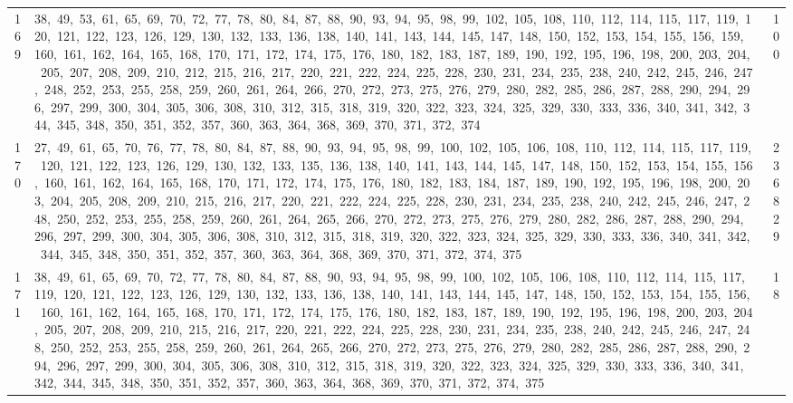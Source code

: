 \begin{longtable}{c|p{}|r}
169 & 38,\ 49,\ 53,\ 61,\ 65,\ 69,\ 70,\ 72,\ 77,\ 78,\ 80,\ 84,\ 87,\ 88,\ 90,\ 93,\ 94,\ 95,\ 98,\ 99,\ 102,\ 105,\ 108,\ 110,\ 112,\ 114,\ 115,\ 117,\ 119,\ 120,\ 121,\ 122,\ 123,\ 126,\ 129,\ 130,\ 132,\ 133,\ 136,\ 138,\ 140,\ 141,\ 143,\ 144,\ 145,\ 147,\ 148,\ 150,\ 152,\ 153,\ 154,\ 155,\ 156,\ 159,\ 160,\ 161,\ 162,\ 164,\ 165,\ 168,\ 170,\ 171,\ 172,\ 174,\ 175,\ 176,\ 180,\ 182,\ 183,\ 187,\ 189,\ 190,\ 192,\ 195,\ 196,\ 198,\ 200,\ 203,\ 204,\ 205,\ 207,\ 208,\ 209,\ 210,\ 212,\ 215,\ 216,\ 217,\ 220,\ 221,\ 222,\ 224,\ 225,\ 228,\ 230,\ 231,\ 234,\ 235,\ 238,\ 240,\ 242,\ 245,\ 246,\ 247,\ 248,\ 252,\ 253,\ 255,\ 258,\ 259,\ 260,\ 261,\ 264,\ 266,\ 270,\ 272,\ 273,\ 275,\ 276,\ 279,\ 280,\ 282,\ 285,\ 286,\ 287,\ 288,\ 290,\ 294,\ 296,\ 297,\ 299,\ 300,\ 304,\ 305,\ 306,\ 308,\ 310,\ 312,\ 315,\ 318,\ 319,\ 320,\ 322,\ 323,\ 324,\ 325,\ 329,\ 330,\ 333,\ 336,\ 340,\ 341,\ 342,\ 344,\ 345,\ 348,\ 350,\ 351,\ 352,\ 357,\ 360,\ 363,\ 364,\ 368,\ 369,\ 370,\ 371,\ 372,\ 374 & 100 \\
170 & 27,\ 49,\ 61,\ 65,\ 70,\ 76,\ 77,\ 78,\ 80,\ 84,\ 87,\ 88,\ 90,\ 93,\ 94,\ 95,\ 98,\ 99,\ 100,\ 102,\ 105,\ 106,\ 108,\ 110,\ 112,\ 114,\ 115,\ 117,\ 119,\ 120,\ 121,\ 122,\ 123,\ 126,\ 129,\ 130,\ 132,\ 133,\ 135,\ 136,\ 138,\ 140,\ 141,\ 143,\ 144,\ 145,\ 147,\ 148,\ 150,\ 152,\ 153,\ 154,\ 155,\ 156,\ 160,\ 161,\ 162,\ 164,\ 165,\ 168,\ 170,\ 171,\ 172,\ 174,\ 175,\ 176,\ 180,\ 182,\ 183,\ 184,\ 187,\ 189,\ 190,\ 192,\ 195,\ 196,\ 198,\ 200,\ 203,\ 204,\ 205,\ 208,\ 209,\ 210,\ 215,\ 216,\ 217,\ 220,\ 221,\ 222,\ 224,\ 225,\ 228,\ 230,\ 231,\ 234,\ 235,\ 238,\ 240,\ 242,\ 245,\ 246,\ 247,\ 248,\ 250,\ 252,\ 253,\ 255,\ 258,\ 259,\ 260,\ 261,\ 264,\ 265,\ 266,\ 270,\ 272,\ 273,\ 275,\ 276,\ 279,\ 280,\ 282,\ 286,\ 287,\ 288,\ 290,\ 294,\ 296,\ 297,\ 299,\ 300,\ 304,\ 305,\ 306,\ 308,\ 310,\ 312,\ 315,\ 318,\ 319,\ 320,\ 322,\ 323,\ 324,\ 325,\ 329,\ 330,\ 333,\ 336,\ 340,\ 341,\ 342,\ 344,\ 345,\ 348,\ 350,\ 351,\ 352,\ 357,\ 360,\ 363,\ 364,\ 368,\ 369,\ 370,\ 371,\ 372,\ 374,\ 375 & 236829 \\
171 & 38,\ 49,\ 61,\ 65,\ 69,\ 70,\ 72,\ 77,\ 78,\ 80,\ 84,\ 87,\ 88,\ 90,\ 93,\ 94,\ 95,\ 98,\ 99,\ 100,\ 102,\ 105,\ 106,\ 108,\ 110,\ 112,\ 114,\ 115,\ 117,\ 119,\ 120,\ 121,\ 122,\ 123,\ 126,\ 129,\ 130,\ 132,\ 133,\ 136,\ 138,\ 140,\ 141,\ 143,\ 144,\ 145,\ 147,\ 148,\ 150,\ 152,\ 153,\ 154,\ 155,\ 156,\ 160,\ 161,\ 162,\ 164,\ 165,\ 168,\ 170,\ 171,\ 172,\ 174,\ 175,\ 176,\ 180,\ 182,\ 183,\ 187,\ 189,\ 190,\ 192,\ 195,\ 196,\ 198,\ 200,\ 203,\ 204,\ 205,\ 207,\ 208,\ 209,\ 210,\ 215,\ 216,\ 217,\ 220,\ 221,\ 222,\ 224,\ 225,\ 228,\ 230,\ 231,\ 234,\ 235,\ 238,\ 240,\ 242,\ 245,\ 246,\ 247,\ 248,\ 250,\ 252,\ 253,\ 255,\ 258,\ 259,\ 260,\ 261,\ 264,\ 265,\ 266,\ 270,\ 272,\ 273,\ 275,\ 276,\ 279,\ 280,\ 282,\ 285,\ 286,\ 287,\ 288,\ 290,\ 294,\ 296,\ 297,\ 299,\ 300,\ 304,\ 305,\ 306,\ 308,\ 310,\ 312,\ 315,\ 318,\ 319,\ 320,\ 322,\ 323,\ 324,\ 325,\ 329,\ 330,\ 333,\ 336,\ 340,\ 341,\ 342,\ 344,\ 345,\ 348,\ 350,\ 351,\ 352,\ 357,\ 360,\ 363,\ 364,\ 368,\ 369,\ 370,\ 371,\ 372,\ 374,\ 375 & 18 \\

\end{longtable}
